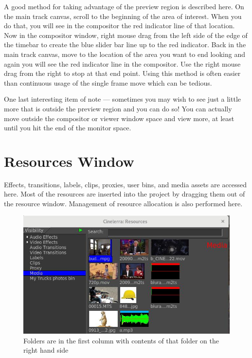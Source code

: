 A good method for taking advantage of the preview region is described here.  
On the main track canvas, scroll to the beginning of the area of interest.  
When you do that, you will see in the compositor the red indicator line of that location.  
Now in the compositor window, right mouse drag from the left side of the edge of the timebar to create the blue slider bar line up to the red indicator.  
Back in the main track canvas, move to the location of the area you want to end looking and again you will see the red indicator line in the compositor.  
Use the right mouse drag from the right to stop at that end point.  Using this method is often easier than continuous usage of the single frame move which can be tedious.

One last interesting item of note --- sometimes you may wish to see just a little more that is outside the preview region and you can do so!  You can actually move outside the compositor or viewer window space and view more, at least until you hit the end of the monitor space.

\section{Resources Window}%
\label{sec:resources_window}

Effects, transitions, labels, clips, proxies, user bins, and media assets are accessed here. 
Most of the resources are inserted into the project by dragging them out of the resource window. 
Management of resource allocation is also performed here.

\begin{figure}[htpb]
    \centering
    \includegraphics[width=0.99\linewidth]{images/resource_window.png}
    \caption{Folders are in the first column with contents of that folder on the right hand side}
    \label{fig:resource_window}
\end{figure}

